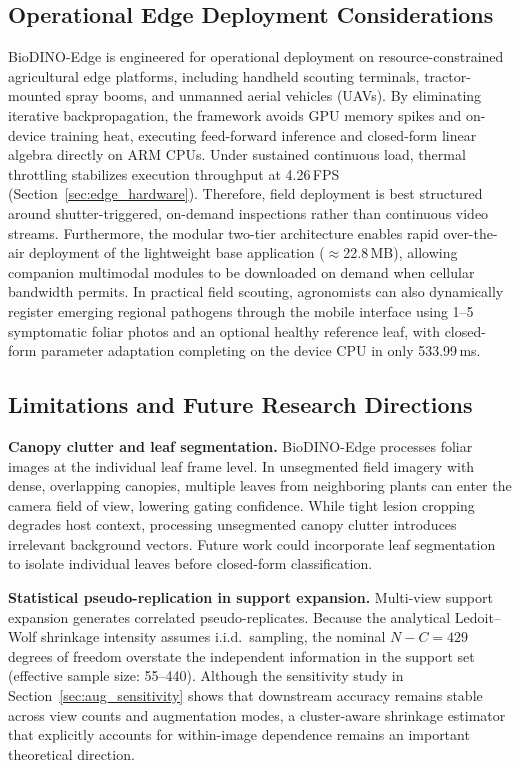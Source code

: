\documentclass[preprint,12pt]{elsarticle}
\begin{document}
\subsection{Operational Edge Deployment Considerations}
BioDINO-Edge is engineered for operational deployment on resource-constrained agricultural edge platforms, including handheld scouting terminals, tractor-mounted spray booms, and unmanned aerial vehicles (UAVs). By eliminating iterative backpropagation, the framework avoids GPU memory spikes and on-device training heat, executing feed-forward inference and closed-form linear algebra directly on ARM CPUs. Under sustained continuous load, thermal throttling stabilizes execution throughput at 4.26\,FPS (Section~\ref{sec:edge_hardware}). Therefore, field deployment is best structured around shutter-triggered, on-demand inspections rather than continuous video streams. Furthermore, the modular two-tier architecture enables rapid over-the-air deployment of the lightweight base application ($\approx$22.8\,MB), allowing companion multimodal modules to be downloaded on demand when cellular bandwidth permits. In practical field scouting, agronomists can also dynamically register emerging regional pathogens through the mobile interface using 1--5 symptomatic foliar photos and an optional healthy reference leaf, with closed-form parameter adaptation completing on the device CPU in only 533.99\,ms.

\subsection{Limitations and Future Research Directions}
\textbf{Canopy clutter and leaf segmentation.} BioDINO-Edge processes foliar images at the individual leaf frame level. In unsegmented field imagery with dense, overlapping canopies, multiple leaves from neighboring plants can enter the camera field of view, lowering gating confidence. While tight lesion cropping degrades host context, processing unsegmented canopy clutter introduces irrelevant background vectors. Future work could incorporate leaf segmentation to isolate individual leaves before closed-form classification.

\textbf{Statistical pseudo-replication in support expansion.} Multi-view support expansion generates correlated pseudo-replicates. Because the analytical Ledoit--Wolf shrinkage intensity assumes i.i.d.\ sampling, the nominal $N-C=429$ degrees of freedom overstate the independent information in the support set (effective sample size: 55--440). Although the sensitivity study in Section~\ref{sec:aug_sensitivity} shows that downstream accuracy remains stable across view counts and augmentation modes, a cluster-aware shrinkage estimator that explicitly accounts for within-image dependence remains an important theoretical direction.
\end{document}
